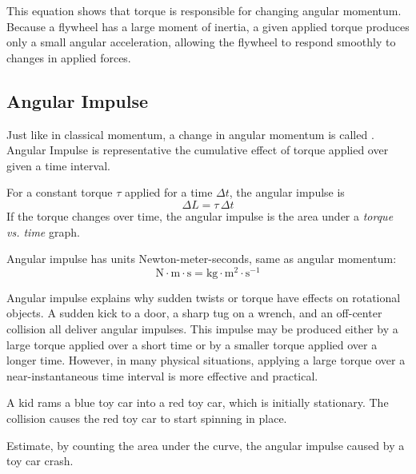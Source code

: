 This equation shows that torque is responsible for changing angular momentum. Because a flywheel has a large moment of inertia, a given applied torque produces only a small angular acceleration, allowing the flywheel to respond smoothly to changes in applied forces. 

\subsection*{Angular Impulse}
Just like in classical momentum, a change in angular momentum is called . Angular Impulse is representative the cumulative effect of torque applied over given a time interval. 
\begin{mdframed}[frametitle = {Angular Impulse}, style = important]
  For a constant torque $\tau$ applied for a time $\Delta t$, the angular impulse is
  \begin{equation}
  \Delta L = \tau \, \Delta t
  \end{equation}
If the torque changes over time, the angular impulse is the area under a \emph{torque vs. time} graph. 

Angular impulse has units Newton-meter-seconds, same as angular momentum:
$$\text{N}\cdot \text{m} \cdot \text{s} = \text{kg} \cdot \text{m}^2\cdot \text{s}^{-1}$$
\end{mdframed}

Angular impulse explains why sudden twists or torque have effects on rotational objects. A sudden kick to a door, a sharp tug on a wrench, and an off-center collision all deliver angular impulses. This impulse may be produced either by a large torque applied over a short time or by a smaller torque applied over a longer time. However, in many physical situations, applying a large torque over a near-instantaneous time interval is more effective and practical.

\begin{Exercise}[title={Angular Impulse}, label={ex:ang_imp}]

  A kid rams a blue toy car into a red toy car, which is initially stationary. The collision causes the red toy car to start spinning in place.

  Estimate, by counting the area under the curve, the angular impulse caused by a toy car crash.

\end{Exercise}

